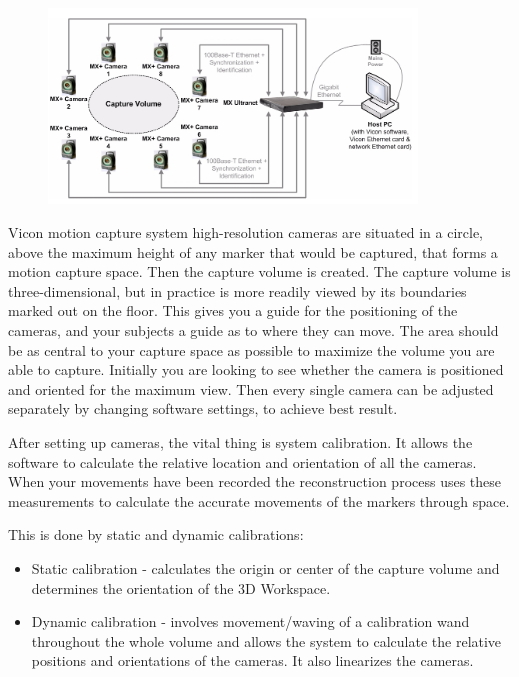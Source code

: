 \begin{figure}
  \centering
  \includegraphics[width=98mm]{images/vicon_mx_basic.jpg}
\end{figure}


Vicon motion capture system high-resolution cameras are situated in a circle,
above the maximum height of any marker that would be captured,
that forms a motion capture space. Then the capture volume is created.
The capture volume is three-dimensional, but in practice is more readily viewed
by its boundaries marked out on the floor. This gives you a guide for the
positioning of the cameras, and your subjects a guide as to where they
can move. The area should be as central to your capture space as possible
to maximize the volume you are able to capture.
Initially you are looking to see whether the camera is positioned and oriented
for the maximum view. Then every single camera can be adjusted separately
by changing software settings, to achieve best result.

After setting up cameras, the vital thing is system calibration.
It allows the software to calculate the relative location and
orientation of all the cameras. When your movements have been recorded the
reconstruction process uses these measurements to calculate the accurate
movements of the markers through space.

This is done by static and dynamic calibrations:

\begin{itemize}
\item Static calibration - calculates the origin or center of the capture volume and determines the
orientation of the 3D Workspace.
\item Dynamic calibration - involves movement/waving of a calibration wand throughout the whole volume and
allows the system to calculate the relative positions and orientations of the
cameras. It also linearizes the cameras.
\end{itemize}

